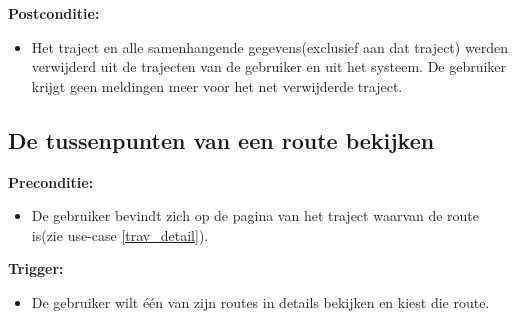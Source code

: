 \documentclass[11pt,twoside,a4paper]{article}
\newcommand{\subpunt}[1]{
	\noindent
	\textbf{\small{#1}}
}
\newenvironment{precond}{
	\subpunt{Preconditie:}
	\begin{itemize}[label={}]
}{
	\end{itemize}
}
\newenvironment{trigger}{
	\subpunt{Trigger:}
	\begin{itemize}[label={}]
}{
	\end{itemize}
}
\newenvironment{mainss}{
	\subpunt{Main succes scenario:}
	\begin{enumerate}
}{
	\end{enumerate}
}
\newenvironment{postcond}{
	\subpunt{Postconditie:}
	\begin{itemize}[label={}]
}{
	\end{itemize}
}
\begin{document}
	\begin{postcond}
	\item Het traject en alle samenhangende gegevens(exclusief aan dat traject) werden verwijderd uit de trajecten van de gebruiker en uit het systeem. De gebruiker krijgt geen meldingen meer voor het net verwijderde traject. %
	\end{postcond}
	
	
	
	\subsection{De tussenpunten van een route bekijken}\label{rout_detail}
	
	\begin{precond}
		\item De gebruiker bevindt zich op de pagina van het traject waarvan de route is(zie use-case \ref{trav_detail}).
	\end{precond}
	
	\begin{trigger}
		\item De gebruiker wilt \'e\'en van zijn routes in details bekijken en kiest die route.
	\end{trigger}
	
\end{document}
